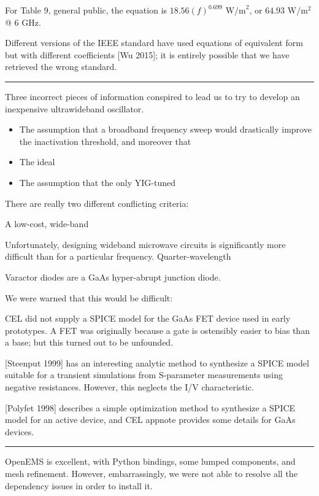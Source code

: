 \documentclass[paper.tex]{subfiles}
\begin{document}
For Table 9, general public, the equation is $18.56 (f)^{0.699} \text{ W/m}^2$, or $64.93 \text{ W}/\text{m}^2$ @ 6 GHz. 

Different versions of the IEEE standard have used equations of equivalent form but with different coefficients [Wu 2015]; it is entirely possible that we have retrieved the wrong standard.

\rule{\linewidth}{0.2pt}




Three incorrect pieces of information conspired to lead us to try to develop an inexpensive ultrawideband oscillator.

\begin{itemize}
	\item The assumption that a broadband frequency sweep would drastically improve the inactivation threshold, and moreover that 
	\item The ideal 
	\item The assumption that the only YIG-tuned 
\end{itemize}

There are really two different conflicting criteria: 

A low-cost, wide-band

Unfortunately, designing wideband microwave circuits is significantly more difficult than for a particular frequency. Quarter-wavelength 

Varactor diodes are a GaAs hyper-abrupt junction diode.

We were warned that this would be difficult: 



CEL did not supply a SPICE model for the GaAs FET device used in early prototypes. A FET was originally because a gate is ostensibly easier to bias than a base; but this turned out to be unfounded.

[Steenput 1999] has an interesting analytic method to synthesize a SPICE model suitable for a transient simulations from S-parameter measurements using negative resistances. However, this neglects the I/V characteristic. 

[Polyfet 1998] describes a simple optimization method to synthesize a SPICE model for an active device, and CEL appnote provides some details for GaAs devices.



\rule{\linewidth}{0.2pt}

OpenEMS is excellent, with Python bindings, some lumped components, and mesh refinement. However, embarrassingly, we were not able to resolve all the dependency issues in order to install it.
\end{document}
